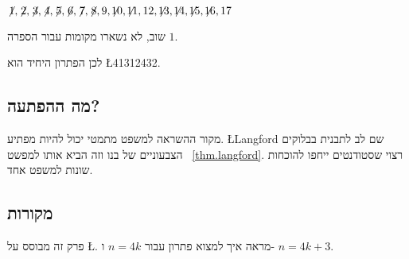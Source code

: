 $\not\! 1,\not\! 2,\not\! 3,\not\! 4,\not\! 5,\not\! 6,\not\! 7,\not\! 8,9,\not\!\! 10,\not\!\! 11,12,\not\!\! 13,\not\!\! 14,\not\!\! 15,\not\!\! 16,17$

\noindent
שוב, לא נשארו מקומות עבור הספרה $1$.

\medskip

\noindent 
לכן הפתרון היחיד הוא
\L{41312432}.

\subsection*{מה ההפתעה?}

מקור ההשראה למשפט מתמטי יכול להיות מפתיע.
\L{Langford}
שם לב לתבנית בבלוקים הצבעוניים של בנו וזה הביא אותו למפשט%
~\ref{thm.langford}.
רצוי שסטודנטים ייחפו להוכחות שונות למשפט אחד.

\subsection*{מקורות}
פרק זה מבוסס על
\L{\cite{miller}}.
\cite{davies}
מראה איך למצוא פתרון עבור
$n=4k$
ו-%
$n=4k+3$.
